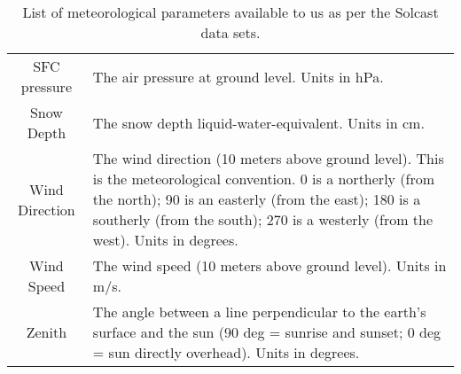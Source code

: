 \begin{table}[htb!]
\begin{adjustwidth*}{-3.0cm}{-3.0cm}
\begin{tabularx}{\linewidth}{cX}
                        SFC pressure                             & The air pressure at ground level. Units in hPa.                                                                                                                                                                                                           \\
                        Snow Depth                               & The snow depth liquid-water-equivalent. Units in cm.                                                                                                                                                                                                      \\
                        Wind Direction                           & The wind direction (10 meters above ground level). This is the meteorological convention. 0 is a northerly (from the north); 90 is an easterly (from the east); 180 is a southerly (from the south); 270 is a westerly (from the west). Units in degrees. \\
                        Wind Speed                               & The wind speed (10 meters above ground level). Units in m/s.                                                                                                                                                                                              \\
                        Zenith                                   & The angle between a line perpendicular to the earth's surface and the sun (90 deg = sunrise and sunset; 0 deg = sun directly overhead). Units in degrees.                                                                                                 \\ \bottomrule
                \end{tabularx}
                \caption{List of meteorological parameters available to us as per the Solcast data sets.}
                \label{tab:Solcast-parameters}
        \end{adjustwidth*}
\end{table}